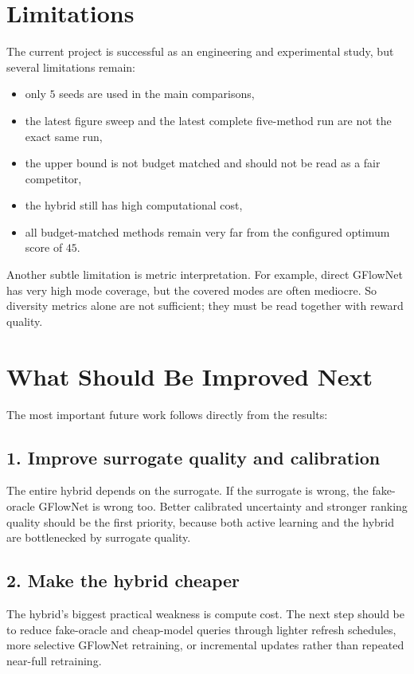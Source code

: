 \documentclass[10pt]{article}
\begin{document}
\section{Limitations}
The current project is successful as an engineering and experimental study, but several limitations remain:
\begin{itemize}
    \item only \(5\) seeds are used in the main comparisons,
    \item the latest figure sweep and the latest complete five-method run are not the exact same run,
    \item the upper bound is not budget matched and should not be read as a fair competitor,
    \item the hybrid still has high computational cost,
    \item all budget-matched methods remain very far from the configured optimum score of \(45\).
\end{itemize}

Another subtle limitation is metric interpretation. For example, direct GFlowNet has very high mode coverage, but the covered modes are often mediocre. So diversity metrics alone are not sufficient; they must be read together with reward quality.

\section{What Should Be Improved Next}
The most important future work follows directly from the results:

\subsection{1. Improve surrogate quality and calibration}
The entire hybrid depends on the surrogate. If the surrogate is wrong, the fake-oracle GFlowNet is wrong too. Better calibrated uncertainty and stronger ranking quality should be the first priority, because both active learning and the hybrid are bottlenecked by surrogate quality.

\subsection{2. Make the hybrid cheaper}
The hybrid's biggest practical weakness is compute cost. The next step should be to reduce fake-oracle and cheap-model queries through lighter refresh schedules, more selective GFlowNet retraining, or incremental updates rather than repeated near-full retraining.
\end{document}
